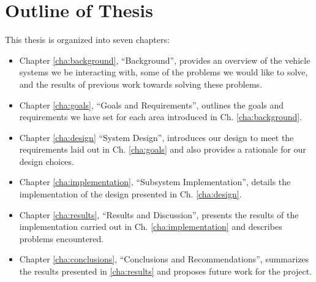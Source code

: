 \section{Outline of Thesis}

This thesis is organized into seven chapters:

\begin{itemize}

\item Chapter \ref{cha:background}, ``Background'', provides an overview of the vehicle systems we be interacting with, some of the problems we would like to solve, and the results of previous work towards solving these problems.

\item Chapter \ref{cha:goals}, ``Goals and Requirements'', outlines the goals and requirements we have set for each area introduced in Ch. \ref{cha:background}. 

\item Chapter \ref{cha:design} ``System Design'', introduces our design to meet the requirements laid out in Ch. \ref{cha:goals} and also provides a rationale for our design choices.

\item Chapter \ref{cha:implementation}, ``Subsystem Implementation'', details the implementation of the design presented in Ch. \ref{cha:design}.

\item Chapter \ref{cha:results}, ``Results and Discussion'', presents the results of the implementation carried out in Ch. \ref{cha:implementation} and describes problems encountered.

\item Chapter \ref{cha:conclusions}, ``Conclusions and Recommendations'', summarizes the results presented in \ref{cha:results} and proposes future work for the project.

\end{itemize}
